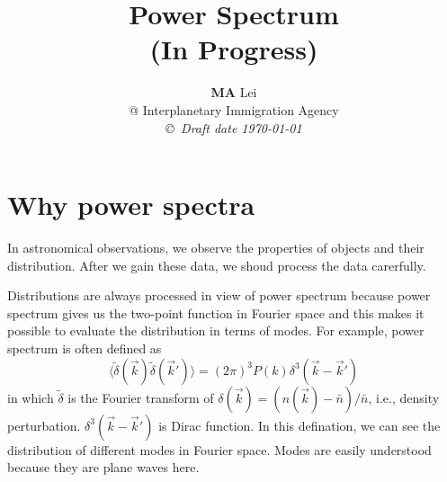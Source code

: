 \documentclass[12pt,a4paper]{book}
\begin{document}
\title{Power Spectrum \\ (\textbf{In Progress})}
\author{{\bf MA} Lei  \\
@ Interplanetary Immigration Agency \\
{\small\em \copyright \ Draft date \today}}
\date{}
\maketitle


\newcommand{\dd}{\mathrm d}
\newenvironment{eqnset}
{\begin{equation}\left \bracevert \begin{array}{l}}
{\end{array} \right. \end{equation}}

\newenvironment{eqn}
{\begin{equation}\left \bracevert \begin{array}{l}}
{\end{array} \right. \end{equation}}








\section{Why power spectra}

In astronomical observations, we observe the properties of objects and their distribution. After we gain these data, we shoud process the data carerfully.

Distributions are always processed in view of power spectrum because power spectrum gives us the two-point function in Fourier space and this makes it possible to evaluate the distribution in terms of modes. For example, power spectrum is often defined as
\begin{equation}
\langle \tilde \delta (\vec k) \tilde \delta (\vec k') \rangle = (2\pi)^3 P(k) \delta^3(\vec k - \vec k')
\end{equation}
in which $\tilde\delta$ is the Fourier transform of $\delta(\vec k) = (n(\vec k) - \bar n)/\bar n$, i.e., density perturbation. $\delta^3(\vec k - \vec k')$ is Dirac function. In this defination, we can see the distribution of different modes in Fourier space. Modes are easily understood because they are plane waves here.
\end{document}
